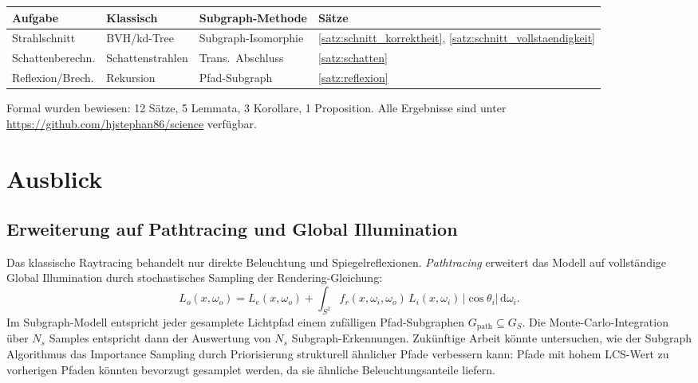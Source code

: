 ﻿\documentclass[a4paper,12pt]{article}
\theoremstyle{definition}
\begin{document}
\begin{center}
\begin{tabular}{@{}llll@{}}
  \toprule
  Aufgabe & Klassisch & Subgraph-Methode & Sätze \\
  \midrule
  Strahlschnitt   & BVH/kd-Tree     & Subgraph-Isomorphie    & \ref{satz:schnitt_korrektheit}, \ref{satz:schnitt_vollstaendigkeit} \\
  Schattenberechn. & Schattenstrahlen & Trans.\ Abschluss     & \ref{satz:schatten} \\
  Reflexion/Brech. & Rekursion       & Pfad-Subgraph          & \ref{satz:reflexion} \\
  \bottomrule
\end{tabular}
\end{center}

Formal wurden bewiesen: 12 Sätze, 5 Lemmata, 3 Korollare,
1 Proposition. Alle Ergebnisse sind unter
\url{https://github.com/hjstephan86/science} verfügbar.

\section{Ausblick}

\subsection{Erweiterung auf Pathtracing und Global Illumination}

Das klassische Raytracing behandelt nur direkte Beleuchtung und
Spiegelreflexionen. \emph{Pathtracing} \citep{Kajiya1986} erweitert
das Modell auf vollständige Global Illumination durch stochastisches
Sampling der Rendering-Gleichung:
\[
  L_o(x, \omega_o) = L_e(x, \omega_o) + \int_{S^2}
  f_r(x, \omega_i, \omega_o)\,L_i(x, \omega_i)\,
  |\cos\theta_i|\,\mathrm{d}\omega_i.
\]
Im Subgraph-Modell entspricht jeder gesamplete Lichtpfad einem
zufälligen Pfad-Subgraphen $G_{\mathrm{path}} \subseteq G_S$.
Die Monte-Carlo-Integration über $N_s$ Samples entspricht dann
der Auswertung von $N_s$ Subgraph-Erkennungen. Zukünftige Arbeit
könnte untersuchen, wie der Subgraph Algorithmus das Importance
Sampling durch Priorisierung strukturell ähnlicher Pfade verbessern
kann: Pfade mit hohem LCS-Wert zu vorherigen Pfaden könnten bevorzugt
gesamplet werden, da sie ähnliche Beleuchtungsanteile liefern.
\end{document}
